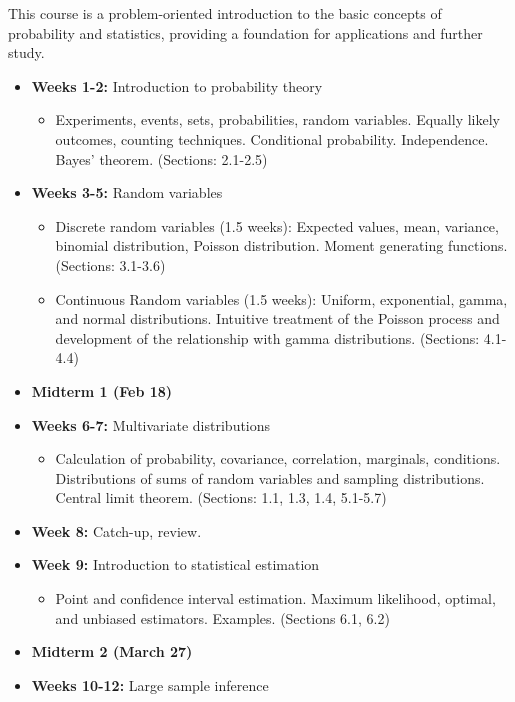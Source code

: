 \documentclass[10pt]{article}
\theoremstyle{definition}
\newcommand{\1}[1]{\textbf{1}_{\left[#1\right]}} %
\begin{document}
This course is a problem-oriented introduction to the basic concepts of probability and statistics,
providing a foundation for applications and further study.

\begin{itemize}
  \item \textbf{Weeks 1-2:} Introduction to probability theory 
  \begin{itemize}
    \item Experiments, events, sets, probabilities, random variables. Equally likely outcomes, counting
    techniques. Conditional probability. Independence. Bayes' theorem. (Sections: 2.1-2.5)
  \end{itemize}
  \item \textbf{Weeks 3-5:} Random variables
  \begin{itemize}
    \item Discrete random variables (1.5 weeks): Expected values, mean, variance, binomial distribution,
    Poisson distribution. Moment generating functions.  (Sections: 3.1-3.6)
    \item Continuous Random variables (1.5 weeks): Uniform, exponential, gamma, and normal distributions.
    Intuitive treatment of the Poisson process and development of the relationship with gamma
    distributions. (Sections: 4.1-4.4)
  \end{itemize}
  \item \textbf{Midterm 1 (Feb 18)}
  \item \textbf{Weeks 6-7:} Multivariate distributions
  \begin{itemize}
    \item Calculation of probability, covariance, correlation, marginals, conditions. Distributions of
    sums of random variables and sampling distributions. Central limit theorem. (Sections: 1.1, 1.3, 1.4, 5.1-5.7)
  \end{itemize}
  \item \textbf{Week 8:} Catch-up, review.
  \item \textbf{Week 9:} Introduction to statistical estimation
  \begin{itemize}
    \item Point and confidence interval estimation. Maximum likelihood, optimal, and unbiased estimators.
    Examples. (Sections 6.1, 6.2)
  \end{itemize}
  \item \textbf{Midterm 2 (March 27)}
  \item \textbf{Weeks 10-12:} Large sample inference

\end{itemize}
\end{document}
